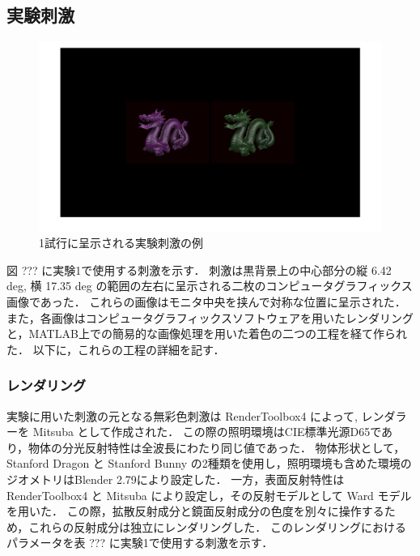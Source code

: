     \subsection{実験刺激}

        \begin{figure}[h]
            \centering
            \includegraphics[width=14.0cm]{./img/ex1_stimuli.png}
            \caption{1試行に呈示される実験刺激の例}
            \label{darkroom}
        \end{figure}

        図 ??? に実験1で使用する刺激を示す．
        刺激は黒背景上の中心部分の縦 6.42 deg, 横 17.35 deg の範囲の左右に呈示される二枚のコンピュータグラフィックス画像であった．
        これらの画像はモニタ中央を挟んで対称な位置に呈示された．
        また，各画像はコンピュータグラフィックスソフトウェアを用いたレンダリングと，MATLAB上での簡易的な画像処理を用いた着色の二つの工程を経て作られた．
        以下に，これらの工程の詳細を記す．

        \subsubsection{レンダリング}

            実験に用いた刺激の元となる無彩色刺激は RenderToolbox4\cite{RenderToolbox} によって, レンダラーを Mitsuba\cite{Mitsuba} として作成された．
            この際の照明環境はCIE標準光源D65であり，物体の分光反射特性は全波長にわたり同じ値であった．
            物体形状として，Stanford Dragon と Stanford Bunny \cite{stanfordModels} の2種類を使用し，照明環境も含めた環境のジオメトリはBlender 2.79により設定した．
            一方，表面反射特性は RenderToolbox4 と Mitsuba により設定し，その反射モデルとして Ward モデル\cite{Ward}を用いた．
            この際，拡散反射成分と鏡面反射成分の色度を別々に操作するため，これらの反射成分は独立にレンダリングした．
            このレンダリングにおけるパラメータを表 ??? に実験1で使用する刺激を示す．

